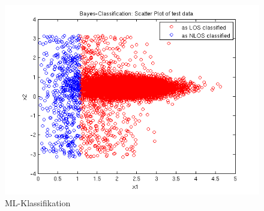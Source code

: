\begin{figure}[ht!]
 \centering
 \includegraphics[width=14cm]{./figures/5_1_1_bayes.png}
 \caption{ML-Klassifikation}
 \label{abb:bayes}
\end{figure}
